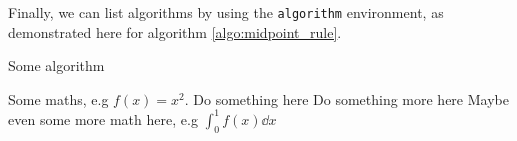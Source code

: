 \documentclass[english,notitlepage]{revtex4}  %
\begin{document}
Finally, we can list algorithms by using the \texttt{algorithm} environment, as demonstrated here for algorithm \ref{algo:midpoint_rule}.
\begin{algorithm}[H]
    \caption{Some algorithm}\label{algo:midpoint_rule}
    \begin{algorithmic}
        \State Some maths, e.g $f(x) = x^2$.  
        \State Do something here 
        \EndFor
        \State Do something more here 
        \EndWhile
        \State Maybe even some more math here, e.g $\int_0^1 f(x) \dd x$
    \end{algorithmic}
\end{algorithm}
   
\end{document}
